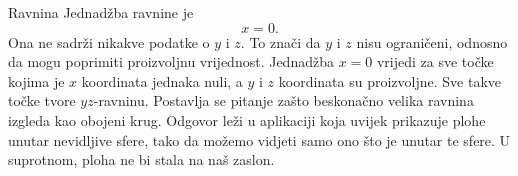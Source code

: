 \begin{surferPage}[Plane]{Ravnina}
Jednad\v zba ravnine je \[x=0.\] Ona ne sadr\v zi nikakve podatke o $y$ i $z$. To zna\v ci da $y$ i $z$ nisu ograni\v ceni, odnosno da mogu poprimiti proizvoljnu vrijednost.
Jednad\v zba $x=0$ vrijedi za sve to\v cke kojima je $x$ koordinata jednaka nuli, a $y$ i $z$ koordinata su proizvoljne. Sve takve to\v cke tvore $yz$-ravninu.
\newline \newline
Postavlja se pitanje za\v sto beskona\v cno velika ravnina izgleda kao obojeni krug. Odgovor le\v zi u aplikaciji koja uvijek prikazuje plohe unutar nevidljive sfere, tako da mo\v zemo vidjeti samo ono \v sto je unutar te sfere. U suprotnom, ploha ne bi stala na na\v s zaslon.
\end{surferPage}
